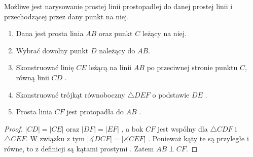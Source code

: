 \documentclass[12pt, a4paper]{scrartcl}
\begin{document}
\begin{theorem}
    Możliwe jest narysowanie prostej linii prostopadłej do danej prostej linii
    i przechodzącej przez dany punkt na niej.

    \begin{enumerate}
        \item Dana jest prosta linia \(AB\) oraz punkt \(C\) leżący na niej.
        \item Wybrać dowolny punkt \(D\) należący do \(AB\).
        \item Skonstruować linię \(CE\) leżącą na linii \(AB\) po przeciwnej
            stronie punktu \(C\), równą linii \(CD\) .
        \item Skonstruować trójkąt równoboczny \(\triangle DEF\) o podstawie
            \(DE\) .
        \item Prosta linia \(CF\) jest protopadła do \(AB\) .
    \end{enumerate}

    \begin{figure}[H]
        \begin{center}
        \end{center}
    \end{figure}

    \begin{proof}
        \(|CD| = |CE|\)  oraz \(|DF| = |EF|\) , a bok \(CF\)
        jest wspólny dla \(\triangle CDF\) i \(\triangle CEF\). W związku z tym
        \(|\measuredangle DCF| = |\measuredangle CEF|\) . Ponieważ
        kąty te są przyległe i równe, to z definicji są kątami prostymi
        . Zatem \(AB \perp CF\).
    \end{proof}
\end{theorem}
\end{document}
